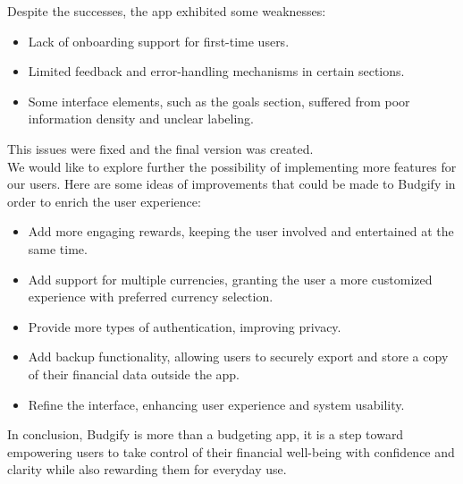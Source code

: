 \documentclass[a4paper,12pt]{article}
\begin{document}
Despite the successes, the app exhibited some weaknesses:
\begin{itemize}
    \item Lack of onboarding support for first-time users.
    \item Limited feedback and error-handling mechanisms in certain sections.
    \item Some interface elements, such as the goals section, suffered from poor information density and unclear labeling.
\end{itemize}
This issues were fixed and the final version was created.
\vspace{0.5cm}\\
We would like to explore further the possibility of implementing more features for our users. Here are some ideas of improvements that could be made to Budgify in order to enrich the user experience:
\begin{itemize}
    \item Add more engaging rewards, keeping the user involved and entertained at the same time.
    \item Add support for multiple currencies, granting the user a more customized experience with preferred currency selection.
    \item Provide more types of authentication, improving privacy.
    \item Add backup functionality, allowing users to securely export and store a copy of their financial data outside the app.
    \item Refine the interface, enhancing user experience and system usability.
\end{itemize}
In conclusion, Budgify is more than a budgeting app, it is a step toward empowering users to take control of their financial well-being with confidence and clarity while also rewarding them for everyday use.
\end{document}
